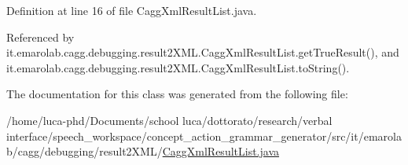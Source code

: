 Definition at line 16 of file Cagg\-Xml\-Result\-List.\-java.



Referenced by it.\-emarolab.\-cagg.\-debugging.\-result2\-X\-M\-L.\-Cagg\-Xml\-Result\-List.\-get\-True\-Result(), and it.\-emarolab.\-cagg.\-debugging.\-result2\-X\-M\-L.\-Cagg\-Xml\-Result\-List.\-to\-String().



The documentation for this class was generated from the following file\-:\begin{DoxyCompactItemize}
\item 
/home/luca-\/phd/\-Documents/school luca/dottorato/research/verbal interface/speech\-\_\-workspace/concept\-\_\-action\-\_\-grammar\-\_\-generator/src/it/emarolab/cagg/debugging/result2\-X\-M\-L/\hyperlink{CaggXmlResultList_8java}{Cagg\-Xml\-Result\-List.\-java}\end{DoxyCompactItemize}
